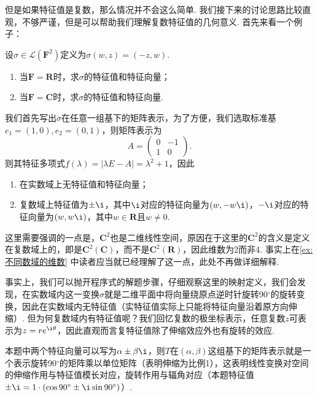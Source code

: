 但是如果特征值是复数，那么情况并不会这么简单. 我们接下来的讨论思路比较直观，不够严谨，但是可以帮助我们理解复数特征值的几何意义. 首先来看一个例子：
\begin{example}{}{}
    设$\sigma\in\mathcal{L}(\mathbf{F}^2)$定义为$\sigma(w,z)=(-z,w)$.
    \begin{enumerate}
        \item 当$\mathbf{F}=\mathbf{R}$时，求$\sigma$的特征值和特征向量；

        \item 当$\mathbf{F}=\mathbf{C}$时，求$\sigma$的特征值和特征向量.
    \end{enumerate}
\end{example}

\begin{solution}
    我们首先写出$\sigma$在任意一组基下的矩阵表示，为了方便，我们选取标准基$e_1=(1,0),e_2=(0,1)$，则矩阵表示为
    \[ A=\begin{pmatrix}
            0 & -1 \\ 1 & 0
        \end{pmatrix}. \]
    则其特征多项式$f(\lambda)=|\lambda E-A|=\lambda^2+1$，因此
    \begin{enumerate}
        \item 在实数域上无特征值和特征向量；

        \item 复数域上特征值为$\pm\i$，其中$\i$对应的特征向量为$(w,-w\i)$，$-\i$对应的特征向量为$(w,w\i)$，其中$w\in\mathbf{R}$且$w\neq 0$.
    \end{enumerate}
\end{solution}

这里需要强调的一点是，$\mathbf{C}^2$也是二维线性空间，原因在于这里的$\mathbf{C}^2$的含义是定义在复数域上的，即是$\mathbf{C}^2(\mathbf{C})$，而不是$\mathbf{C}^2(\mathbf{R})$，因此维数为2而非4. 事实上在\autoref{ex:不同数域的维数} 中读者应当就已经理解了这一点，此处不再做详细解释.

事实上，我们可以抛开程序式的解题步骤，仔细观察这里的映射定义，我们会发现，在实数域内这一变换$\sigma$就是二维平面中将向量绕原点逆时针旋转90$^\circ$的旋转变换，因此在实数域内无特征值（实特征值实际上只能将特征向量沿着原方向伸缩）. 但为何复数域内有特征值呢？我们回忆复数的极坐标表示，任意复数$z$可表示为$z=re^{\i\theta}$，因此直观而言复特征值除了伸缩效应外也有旋转的效应.

本题中两个特征向量可以写为$\alpha\pm \beta\i$，则$T$在$(\alpha,\beta)$这组基下的矩阵表示就是一个表示旋转90$^\circ$的矩阵乘以单位矩阵（表明伸缩为比例1），这表明线性变换对空间的伸缩作用与特征值模长对应，旋转作用与辐角对应（本题特征值$\pm \i=1\cdot(\cos 90^\circ\pm \i\sin 90^\circ)$）.

